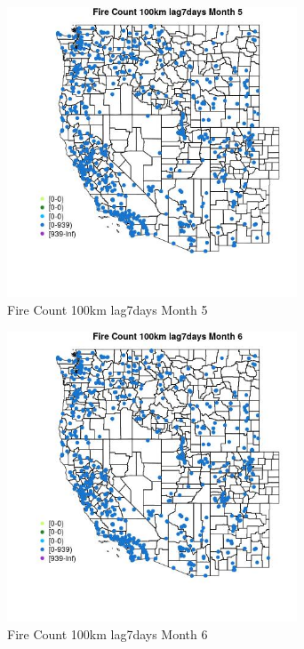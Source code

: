 \begin{figure} 
\centering  
\includegraphics[width=0.77\textwidth]{Code_Outputs/Report_ML_input_PM25_Step4_part_e_de_duplicated_aves_compiled_2019-05-21wNAs_MapObsMo5Fire_Count_100km_lag7days.jpg} 
\caption{\label{fig:Report_ML_input_PM25_Step4_part_e_de_duplicated_aves_compiled_2019-05-21wNAsMapObsMo5Fire_Count_100km_lag7days}Fire Count 100km lag7days Month 5} 
\end{figure} 
 

\begin{figure} 
\centering  
\includegraphics[width=0.77\textwidth]{Code_Outputs/Report_ML_input_PM25_Step4_part_e_de_duplicated_aves_compiled_2019-05-21wNAs_MapObsMo6Fire_Count_100km_lag7days.jpg} 
\caption{\label{fig:Report_ML_input_PM25_Step4_part_e_de_duplicated_aves_compiled_2019-05-21wNAsMapObsMo6Fire_Count_100km_lag7days}Fire Count 100km lag7days Month 6} 
\end{figure} 
 

